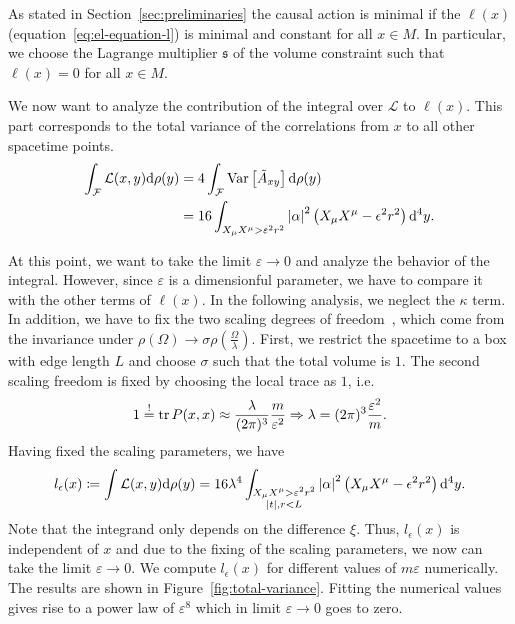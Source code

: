 \documentclass[reqno,11pt]{amsart}
\DeclareMathOperator{\Var}{Var}
\newcommand{\defeq}{\coloneqq}
\newcommand{\s}{{\mathfrak{s}}}
\renewcommand{\L}{{\mathcal{L}}}
\numberwithin{equation}{section}
\begin{document}
As stated in Section~\ref{sec:preliminaries} the causal action is minimal if the $\ell(x)$ (equation~\eqref{eq:el-equation-l})
is minimal and constant for all $x \in M$.
In particular, we choose the Lagrange multiplier $\s$ of the volume constraint such that $\ell(x) = 0$ for all $x \in M$.

We now want to analyze the contribution of the integral over $\L$ to $\ell(x)$.
This part corresponds to the total variance of the correlations from $x$ to all other spacetime points.
\begin{align}
    \int_\mathcal{F} \L(x, y) \dd \rho(y) &= 4 \int_{\mathcal{F}} \Var \left[ \tilde{A}_{xy} \right] \dd \rho(y) \nonumber \\
    &= 16 \int_{X_\mu X^\mu > \varepsilon^2 r^2} \abs{\alpha}^2 \left( X_\mu X^\mu - \epsilon^2 r^2 \right) \dd^4 y.
\end{align}

At this point, we want to take the limit $\varepsilon \to 0$ and analyze the behavior of the integral.
However, since $\varepsilon$ is a dimensionful parameter, we have to compare it with the other terms of $\ell(x)$.
In the following analysis, we neglect the $\kappa$ term.
In addition, we have to fix the two scaling degrees of freedom~\cite{Curiel2020}, which come from the invariance under $\rho(\Omega) \to \sigma \rho \left( \frac{\Omega}{\lambda} \right)$.
First, we restrict the spacetime to a box with edge length $L$ and choose $\sigma$ such that the total volume is $1$.
The second scaling freedom is fixed by choosing the local trace as $1$, i.e.
\begin{align}
    1 \stackrel{!}{=} \tr P(x, x) \approx \frac{\lambda}{(2 \pi)^3} \frac{m}{\varepsilon^2} \Rightarrow \lambda = (2 \pi)^3 \frac{\varepsilon^2}{m}.
\end{align}
Having fixed the scaling parameters, we have
\begin{align}\label{eq:total-variance}
    l_\epsilon(x) \defeq \int \L(x, y) \dd \rho(y) = 16 \lambda^4 \int_{\substack{X_\mu X^\mu > \varepsilon^2 r^2 \\ \abs{t}, r < L}} \abs{\alpha}^2 \left( X_\mu X^\mu - \epsilon^2 r^2 \right) \dd^4 y.
\end{align}
Note that the integrand only depends on the difference $\xi$.
Thus, $l_\epsilon(x)$ is independent of $x$ and due to the fixing of the scaling parameters, we now can take the limit
$\varepsilon \to 0$.
We compute $l_\epsilon(x)$ for different values of $m \varepsilon$ numerically.
The results are shown in Figure~\ref{fig:total-variance}.
Fitting the numerical values gives rise to a power law of $\varepsilon^8$ which in limit $\varepsilon \to 0$ goes to zero.
\end{document}
